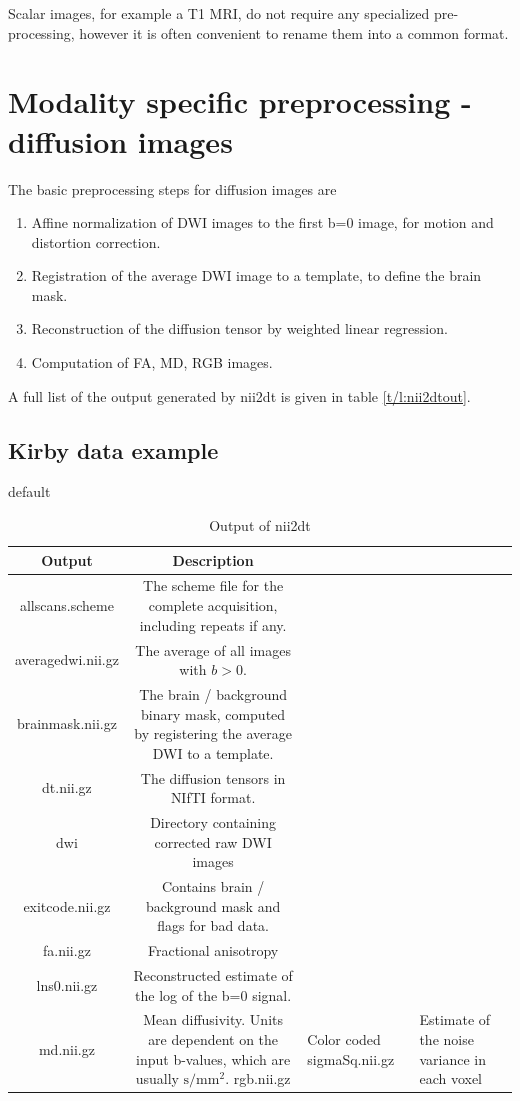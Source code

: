 \documentclass{InsightArticle}
\begin{document}
Scalar images, for example a T1 MRI, do not require any specialized pre-processing, however it is often convenient to rename them into a common format.


\section{Modality specific preprocessing - diffusion images}

The basic preprocessing steps for diffusion images are
\begin{enumerate}
\item Affine normalization of DWI images to the first b=0 image, for motion and distortion correction. 
\item Registration of the average DWI image to a template, to define the brain mask.
\item Reconstruction of the diffusion tensor by weighted linear regression.
\item Computation of FA, MD, RGB images.
\end{enumerate}
A full list of the output generated by nii2dt is given in table \ref{t/l:nii2dtout}.

\subsection{Kirby data example}

\begin{table}[htdp]
\caption{default}
\begin{center}
\begin{tabular}{|c|c|}
\hline
\textbf{Output} & \textbf{Description} \\ \hline
allscans.scheme & The scheme file for the complete acquisition, including repeats if any. \\ \hline
averagedwi.nii.gz & The average of all images with $b > 0$. \\ \hline
brainmask.nii.gz & The brain / background binary mask, computed by registering the average DWI to a template. \\ \hline
dt.nii.gz         & The diffusion tensors in NIfTI format. \\ \hline
dwi               & Directory containing corrected raw DWI images \\ \hline
exitcode.nii.gz   & Contains brain / background mask and flags for bad data. \\ \hline
fa.nii.gz            & Fractional anisotropy \\ \hline
lns0.nii.gz       & Reconstructed estimate of the log of the b=0 signal. \\ \hline
md.nii.gz          & Mean diffusivity. Units are dependent on the input b-values, which are usually $\textrm{s} / \textrm{mm}^2$.
rgb.nii.gz           & Color coded 
sigmaSq.nii.gz    & Estimate of the noise variance in each voxel \\ \hline
\end{tabular}
\end{center}
\label{tbl:nii2dtout}
\caption{Output of nii2dt}
\end{table}%
\end{document}
